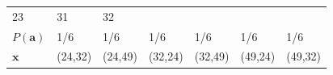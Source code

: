 \documentclass[
]{book}
\theoremstyle{definition}
\theoremstyle{definition}
\theoremstyle{definition}
\theoremstyle{remark}
\begin{document}
\begin{longtable}[]{@{}lllllll@{}}
\begin{minipage}[t]{0.09\columnwidth}
23\strut
\end{minipage} & \begin{minipage}[t]{0.09\columnwidth}\raggedright
31\strut
\end{minipage} & \begin{minipage}[t]{0.09\columnwidth}\raggedright
32\strut
\end{minipage}\tabularnewline
\begin{minipage}[t]{0.27\columnwidth}\raggedright
\(P(\boldsymbol{a})\)\strut
\end{minipage} & \begin{minipage}[t]{0.09\columnwidth}\raggedright
1/6\strut
\end{minipage} & \begin{minipage}[t]{0.09\columnwidth}\raggedright
1/6\strut
\end{minipage} & \begin{minipage}[t]{0.09\columnwidth}\raggedright
1/6\strut
\end{minipage} & \begin{minipage}[t]{0.09\columnwidth}\raggedright
1/6\strut
\end{minipage} & \begin{minipage}[t]{0.09\columnwidth}\raggedright
1/6\strut
\end{minipage} & \begin{minipage}[t]{0.09\columnwidth}\raggedright
1/6\strut
\end{minipage}\tabularnewline
\begin{minipage}[t]{0.27\columnwidth}\raggedright
\(\boldsymbol{x}\)\strut
\end{minipage} & \begin{minipage}[t]{0.09\columnwidth}\raggedright
(24,32)\strut
\end{minipage} & \begin{minipage}[t]{0.09\columnwidth}\raggedright
(24,49)\strut
\end{minipage} & \begin{minipage}[t]{0.09\columnwidth}\raggedright
(32,24)\strut
\end{minipage} & \begin{minipage}[t]{0.09\columnwidth}\raggedright
(32,49)\strut
\end{minipage} & \begin{minipage}[t]{0.09\columnwidth}\raggedright
(49,24)\strut
\end{minipage} & \begin{minipage}[t]{0.09\columnwidth}\raggedright
(49,32)\strut

\end{minipage}
\end{longtable}
\end{document}
